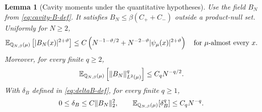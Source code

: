 \documentclass[11pt,reqno]{amsart}
\numberwithin{equation}{section}
\theoremstyle{plain}
\newtheorem{lemma}[lemma]{Lemma}
\theoremstyle{remark}
\DeclarePairedDelimiter{\abs}{\lvert}{\rvert}
\DeclarePairedDelimiter{\norm}{\lVert}{\rVert}
\newcommand{\E}{{\mathbb{E}}}
\newcommand{\Q}{{\mathbb{Q}}}
\newcommand{\be}{\beta}
\begin{document}
\begin{lemma}[Cavity moments under the quantitative hypotheses]
\label{lem:signed-cavity-moments}
Use the field $B_N$ from \eqref{eq:cavity-B-def}.  It satisfies
$B_N\leq\be(C_++C_-)$ outside a product-null set.  Uniformly for $N\geq2$,
\begin{equation}\label{eq:signed-point-cavity-moment}
 \E_{\Q_{N,\be}(\mu)}\left[\abs{B_N(x)}^{2+\vartheta}\right]
 \leq C\left(N^{-1-\vartheta/2}
          +N^{-2-\vartheta}\abs{\psi_\mu(x)}^{2+\vartheta}\right)
 \quad\text{for $\mu$-almost every $x$}.
\end{equation}
Moreover, for every finite $q\geq2$,
\begin{equation}\label{eq:signed-Hilbert-cavity-moment}
 \E_{\Q_{N,\be}(\mu)}\left[\norm{B_N}_{L^2(\mu)}^q\right]
 \leq C_qN^{-q/2}.
\end{equation}
With $\delta_B$ defined in \eqref{eq:deltaB-def}, for every finite $q\geq1$,
\begin{equation}\label{eq:signed-delta-moment}
 0\leq\delta_B\leq C\norm{B_N}_2^2,\qquad
 \E_{\Q_{N,\be}(\mu)}[\delta_B^q]\leq C_qN^{-q}.
\end{equation}
\end{lemma}
\end{document}
